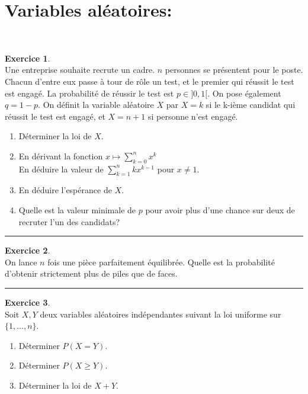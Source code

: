 \documentclass[a4paper,10pt]{article}
\theoremstyle{definition}
\theoremstyle{definition}
\newtheorem{exo}{Exercice}
\begin{document}
\section*{Variables aléatoires:}\hfill\\%
\begin{minipage}{1\linewidth}
	\begin{minipage}[t]{0.48\linewidth}
		\raggedright
		
		
		\begin{exo}\quad\\[0.2cm]
			Une entreprise souhaite recrute un cadre. $n$ personnes se présentent pour le poste. Chacun d'entre eux passe à tour de rôle un test, et le premier qui réussit le test est engagé. La probabilité de réussir le test est $p\in ]0,1[$. On pose également $q=1-p$. On définit la variable aléatoire $X$ par $X=k$ si le k-ième candidat qui réussit le test est engagé, et $X=n+1$ si personne n'est engagé.
			\begin{enumerate}
				\item Déterminer la loi de $X$.
				\item En dérivant la fonction  $x\mapsto \sum_{k=0}^{n}x^k$\\[0.1cm]
				En déduire la valeur de $\sum_{k=1}^{n}kx^{k-1}$ pour $x\neq 1$.
				\item En déduire l'espérance de $X$. 
				\item Quelle est la valeur minimale de $p$ pour avoir plus d'une chance sur deux de recruter l'un des candidats? 
			\end{enumerate}
			\centering
			\rule{1\linewidth}{0.6pt}
		\end{exo}

		
		
		
	\end{minipage}	
	\hfill\vrule\hfill
	\begin{minipage}[t]{0.48\linewidth}
		\raggedright
		
				\begin{exo}\quad\\[0.2cm]
			On lance $n$ fois une pièce parfaitement équilibrée. Quelle est la probabilité d'obtenir strictement plus de piles que de faces.
			
			\centering
			\rule{1\linewidth}{0.6pt}
		\end{exo}	
	
		\begin{exo}\quad\\[0.2cm]
		Soit $X,Y$ deux variables aléatoires indépendantes suivant la loi uniforme sur $\{1,...,n\}$.
		\begin{enumerate}
			\item Déterminer $P(X=Y)$.
			\item Déterminer $P(X\geq Y)$.
			\item Déterminer la loi de $X+Y$.
		\end{enumerate}
		

\end{exo}
\end{minipage}
\end{minipage}
\end{document}
